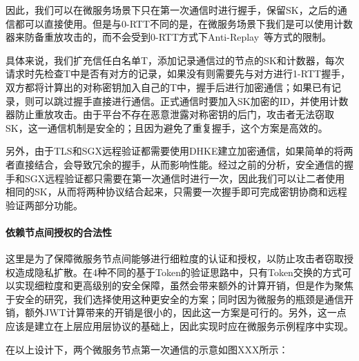 因此，我们可以在微服务场景下只在第一次通信时进行握手，保留SK，之后的通信都可以直接使用。但是与0-RTT不同的是，在微服务场景下我们是可以使用计数器来防备重放攻击的，而不会受到0-RTT方式下Anti-Replay~\cite{}等方式的限制。

具体来说，我们扩充信任白名单T，添加记录通信过的节点的SK和计数器，每次请求时先检查T中是否有对方的记录，如果没有则需要先与对方进行1-RTT握手，双方都将计算出的对称密钥加入自己的T中，握手后进行加密通信；如果已有记录，则可以跳过握手直接进行通信。正式通信时要加入SK加密的ID，并使用计数器防止重放攻击。由于平台不存在恶意泄露对称密钥的后门，攻击者无法窃取SK，这一通信机制是安全的；且因为避免了重复握手，这个方案是高效的。

另外，由于TLS和SGX远程验证都需要使用DHKE建立加密通信，如果简单的将两者直接结合，会导致冗余的握手，从而影响性能。经过之前的分析，安全通信的握手和SGX远程验证都只需要在第一次通信时进行一次，因此我们可以让二者使用相同的SK，从而将两种协议结合起来，只需要一次握手即可完成密钥协商和远程验证两部分功能。

\paragraph{依赖节点间授权的合法性}
这里是为了保障微服务节点间能够进行细粒度的认证和授权，以防止攻击者窃取授权造成隐私扩散。在4种不同的基于Token的验证思路中，只有Token交换的方式可以实现细粒度和更高级别的安全保障，虽然会带来额外的计算开销，但是作为聚焦于安全的研究，我们选择使用这种更安全的方案；同时因为微服务的瓶颈是通信开销，额外JWT计算带来的开销是很小的，因此这一方案是可行的。另外，这一点应该是建立在上层应用层协议的基础上，因此实现时应在微服务示例程序中实现。

在以上设计下，两个微服务节点第一次通信的示意如图XXX所示：


